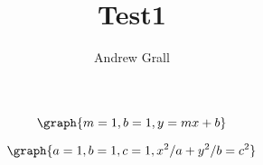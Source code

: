 \documentclass{ximera}
\title{Test1}
\author{Andrew Grall}
\begin{document}
\maketitle

\[
\graph{m=1,b=1,y=mx+b}
\]

\[
\graph{a=1,b=1,c=1,x^2/a+y^2/b=c^2}
\]
\end{document}
